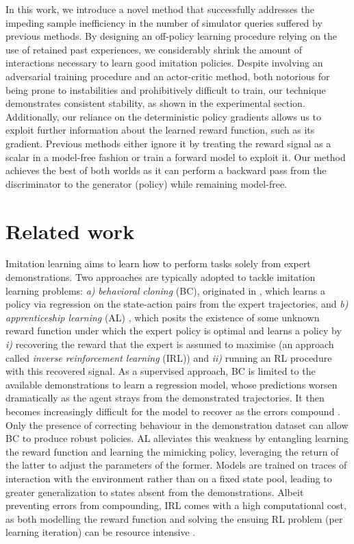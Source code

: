 In this work, we introduce a novel method that successfully addresses the
impeding sample inefficiency in the number of simulator queries
suffered by previous methods.
By designing an off-policy learning procedure relying on the use of
retained past experiences, we considerably shrink the amount of
interactions necessary to learn good imitation policies.
Despite involving an adversarial training procedure and an actor-critic method,
both notorious
for being prone to instabilities and prohibitively difficult to train,
our technique demonstrates consistent stability,
as shown in the experimental section.
Additionally, our reliance on the deterministic policy gradients
allows us to exploit further information about the learned reward
function, such as its gradient.
Previous methods either ignore it by treating the reward signal as a scalar in
a model-free fashion or train a forward model to exploit it.
Our method achieves the best of both worlds as it can perform a backward pass
from the discriminator to the generator (policy) while remaining model-free.

\section{Related work}

Imitation learning aims to learn how to perform tasks solely from expert
demonstrations.
Two approaches are typically adopted to tackle imitation learning problems:
\textit{a)} \textit{behavioral cloning} (BC),
originated in \cite{Pomerleau1989-nh, Pomerleau1990-lm}, which
learns a policy via regression on the state-action pairs from the expert
trajectories, and
\textit{b)} \textit{apprenticeship learning} (AL)
\cite{Abbeel2004-rb}, which posits the existence of some unknown reward
function under which the expert policy is optimal and learns a policy by
\textit{i)} recovering the reward that the expert is assumed to maximise
(an approach called \textit{inverse reinforcement learning} (IRL)) and
\textit{ii)} running an RL procedure with this recovered signal.
As a supervised approach, BC is limited to the available demonstrations to
learn a regression model, whose predictions worsen dramatically as the agent
strays from the demonstrated trajectories.
It then becomes increasingly difficult for the model to recover as the errors
compound \cite{Ross2010-eb, Ross2011-dn, Bagnell2015-ni}.
Only the presence of correcting behaviour in the demonstration dataset can
allow BC to produce robust policies.
AL alleviates this weakness by entangling learning the reward function and
learning the mimicking policy, leveraging the return of the latter to adjust
the parameters of the former. Models are trained on traces of interaction with
the environment rather than on a fixed state pool, leading to greater
generalization to states absent from the demonstrations.
Albeit preventing errors from compounding, IRL comes with a high computational
cost, as both modelling the reward function and solving the ensuing RL problem
(per learning iteration) can be resource intensive
\cite{Syed2008-zo, Syed2008-su, Ho2016-xn, Levine2011-hi}.

